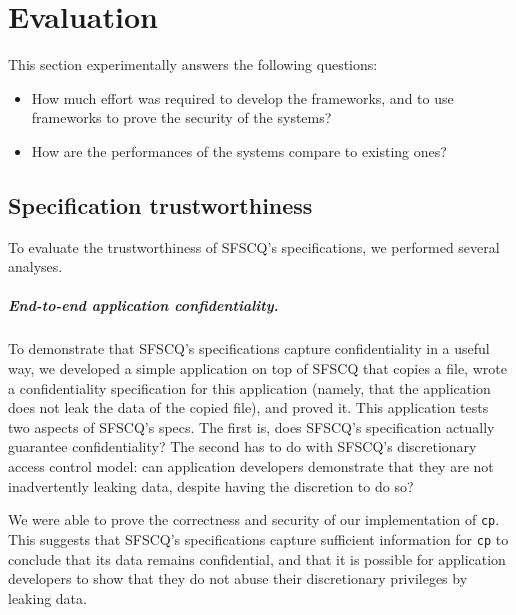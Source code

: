 \chapter{Evaluation}
\label{chapter:Evaluation}

This section experimentally answers the following questions:

\begin{itemize}


\item
  How much effort was required to develop the frameworks, and to use frameworks to prove the security of the systems?

\item 
  How are the performances of the systems compare to existing ones?
\end{itemize}

\section{Specification trustworthiness}

To evaluate the trustworthiness of SFSCQ's specifications, we performed several
analyses.


\paragraph{End-to-end application confidentiality.}

To demonstrate that SFSCQ's specifications capture confidentiality in
a useful way, we developed a simple application on top of SFSCQ that
copies a file, wrote a confidentiality specification for this application
(namely, that the application does not leak the data of the copied
file), and proved it.  This application tests two aspects of SFSCQ's
specs.  The first is, does SFSCQ's specification actually guarantee
confidentiality?  The second has to do with SFSCQ's discretionary access
control model: can application developers demonstrate that they are not
inadvertently leaking data, despite having the discretion to do so?

We were able to prove the correctness and security of our implementation
of \texttt{cp}.  This suggests that SFSCQ's specifications capture sufficient
information for \texttt{cp} to conclude that its data remains confidential,
and that it is possible for application developers to show that they do
not abuse their discretionary privileges by leaking data.


